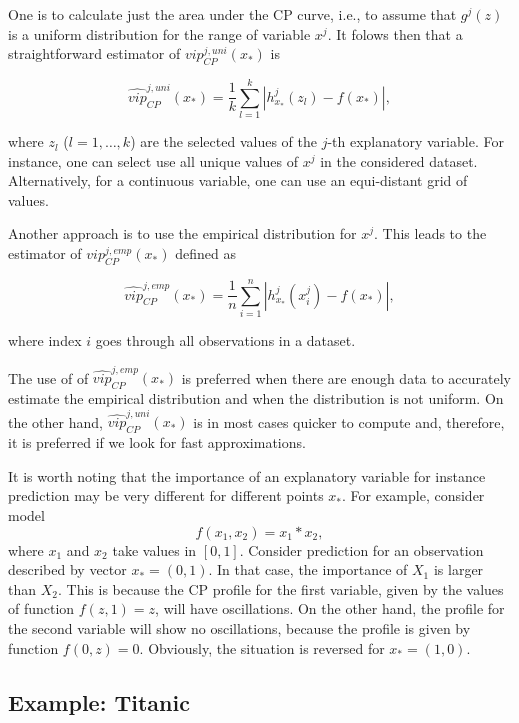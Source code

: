 \documentclass[12pt,]{krantz}
\begin{document}
One is to calculate just the area under the CP curve, i.e., to assume that \(g^j(z)\) is a uniform distribution for the range of variable \(x^j\). It folows then that a straightforward estimator of \(vip_{CP}^{j,uni}(x_*)\) is

\begin{equation}
\widehat{vip}_{CP}^{j,uni}(x_*) = \frac 1k \sum_{l=1}^k |h^{j}_{x_*}(z_l) - f(x_*)|,
\label{eq:VIPCPuni}
\end{equation}

where \(z_l\) (\(l=1, \ldots, k\)) are the selected values of the \(j\)-th explanatory variable. For instance, one can select use all unique values of \(x^{j}\) in the considered dataset. Alternatively, for a continuous variable, one can use an equi-distant grid of values.

Another approach is to use the empirical distribution for \(x^{j}\). This leads to the estimator of \(vip_{CP}^{j,emp}(x_*)\) defined as

\begin{equation}
\widehat{vip}_{CP}^{j,emp}(x_*) = \frac 1n \sum_{i=1}^n |h^{j}_{x_*}(x^{j}_i) - f(x_*)|,
\label{eq:VIPCPemp}
\end{equation}

where index \(i\) goes through all observations in a dataset.

The use of of \(\widehat{vip}_{CP}^{j,emp}(x_*)\) is preferred when there are enough data to accurately estimate the empirical distribution and when the distribution is not uniform. On the other hand, \(\widehat{vip}_{CP}^{j,uni}(x_*)\) is in most cases quicker to compute and, therefore, it is preferred if we look for fast approximations.

It is worth noting that the importance of an explanatory variable for instance prediction may be very different for different points \(x_*\). For example, consider model
\[
f(x_1, x_2) = x_1 * x_2,
\]
where \(x_1\) and \(x_2\) take values in \([0,1]\). Consider prediction for an observation described by vector \(x_* = (0,1)\). In that case, the importance of \(X_1\) is larger than \(X_2\). This is because the CP profile for the first variable, given by the values of function \(f(z,1)=z\), will have oscillations. On the other hand, the profile for the second variable will show no oscillations, because the profile is given by function \(f(0,z)=0\). Obviously, the situation is reversed for \(x_*=(1,0)\).

\hypertarget{CPOscExample}{%
\subsection{Example: Titanic}\label{CPOscExample}}
\end{document}
